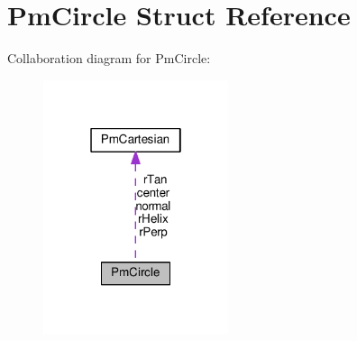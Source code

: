 \hypertarget{structPmCircle}{}\section{Pm\+Circle Struct Reference}
\label{structPmCircle}


Collaboration diagram for Pm\+Circle\+:
\nopagebreak
\begin{figure}[H]
\begin{center}
\leavevmode
\includegraphics[width=154pt]{structPmCircle__coll__graph}
\end{center}
\end{figure}
